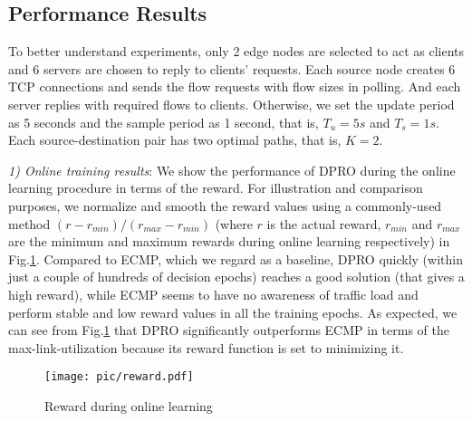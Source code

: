 \documentclass[10pt,conference]{IEEEtran}
\begin{document}
\subsection{Performance Results}\label{results}
To better understand experiments, only 2 edge nodes are selected to act as clients and 6 servers are chosen to reply to clients' requests. Each source node creates 6 TCP connections and sends the flow requests with flow sizes in polling. And each server replies with required flows to clients. Otherwise, we set the update period as 5 seconds and the sample period as 1 second, that is, $T_u=5s$ and $T_s=1s$. Each source-destination pair has two optimal paths, that is, $K=2$.

\emph{1) Online training results}: We show the performance of DPRO during the online learning procedure in terms of the reward. For illustration and comparison purposes, we normalize and smooth the reward values using a commonly-used method $(r-r_{min})/(r_{max}-r_{min})$ (where $r$ is the actual reward, $r_{min}$ and $r_{max}$ are the minimum and maximum rewards during online learning respectively) in Fig.\ref{reward-online}. Compared to ECMP, which we regard as a baseline, DPRO quickly (within just a couple of hundreds of decision epochs) reaches a good solution (that gives a high reward), while ECMP seems to have no awareness of traffic load and perform stable and low reward values in all the training epochs. As expected, we can see from Fig.\ref{reward-online} that DPRO significantly outperforms ECMP in terms of the max-link-utilization because its reward function is set to minimizing it.
\begin{figure}[t]
\centerline{\texttt{[image: pic/reward.pdf]}}
\caption{Reward during online learning}
\label{reward-online}
\end{figure}
\end{document}
